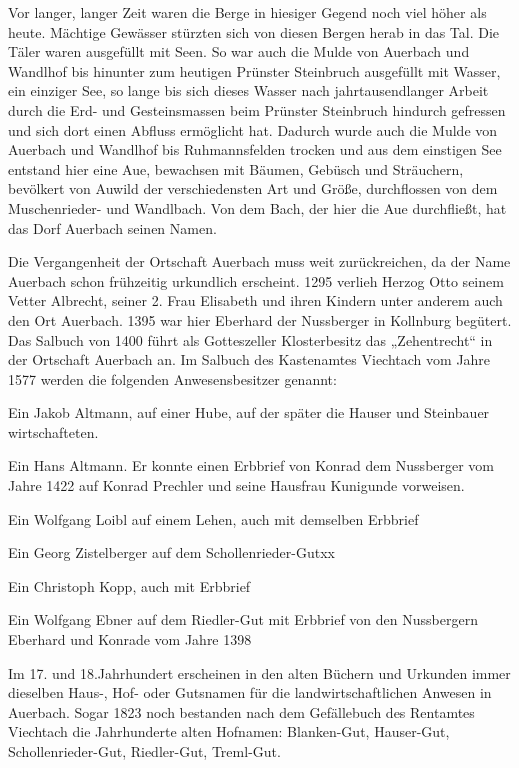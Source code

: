 \documentclass{book}
\begin{document}
Vor langer, langer Zeit waren die Berge in hiesiger Gegend noch viel höher als
heute. Mächtige Gewässer stürzten sich von diesen Bergen herab in das Tal. Die
Täler waren ausgefüllt mit Seen. So war auch die Mulde von Auerbach und Wandlhof
bis hinunter zum heutigen Prünster Steinbruch ausgefüllt mit Wasser, ein
einziger See, so lange bis sich dieses Wasser nach jahrtausendlanger Arbeit
durch die Erd- und Gesteinsmassen beim Prünster Steinbruch hindurch gefressen
und sich dort einen Abfluss ermöglicht hat. Dadurch wurde auch die Mulde von
Auerbach und Wandlhof bis Ruhmannsfelden trocken und aus dem einstigen See
entstand hier eine Aue, bewachsen mit Bäumen, Gebüsch und Sträuchern, bevölkert
von Auwild der verschiedensten Art und Größe, durchflossen von dem
Muschenrieder- und Wandlbach. Von dem Bach, der hier die Aue durchfließt, hat
das Dorf Auerbach seinen Namen.

Die Vergangenheit der Ortschaft Auerbach muss weit zurückreichen, da der Name
Auerbach schon frühzeitig urkundlich erscheint. 1295 verlieh Herzog Otto seinem
Vetter Albrecht, seiner 2. Frau Elisabeth und ihren Kindern unter anderem auch
den Ort Auerbach. 1395 war hier Eberhard der Nussberger in Kollnburg begütert.
Das Salbuch von 1400 führt als Gotteszeller Klosterbesitz das „Zehentrecht“ in
der Ortschaft Auerbach an. Im Salbuch des Kastenamtes Viechtach vom Jahre 1577
werden die folgenden Anwesensbesitzer genannt:



Ein Jakob Altmann, auf einer Hube, auf der später die Hauser und Steinbauer
wirtschafteten.

Ein Hans Altmann. Er konnte einen Erbbrief von Konrad dem Nussberger vom Jahre
1422 auf Konrad Prechler und seine Hausfrau Kunigunde vorweisen.

Ein Wolfgang Loibl auf einem Lehen, auch mit demselben Erbbrief

Ein Georg Zistelberger auf dem Schollenrieder-Gutxx

Ein Christoph Kopp, auch mit Erbbrief

Ein Wolfgang Ebner auf dem Riedler-Gut mit Erbbrief von den Nussbergern Eberhard
und Konrade vom Jahre 1398



Im 17. und 18.Jahrhundert erscheinen in den alten Büchern und Urkunden immer
dieselben Haus-, Hof- oder Gutsnamen für die landwirtschaftlichen Anwesen in
Auerbach. Sogar 1823 noch bestanden nach dem Gefällebuch des Rentamtes Viechtach
die Jahrhunderte alten Hofnamen: Blanken-Gut, Hauser-Gut, Schollenrieder-Gut,
Riedler-Gut, Treml-Gut.
\end{document}
